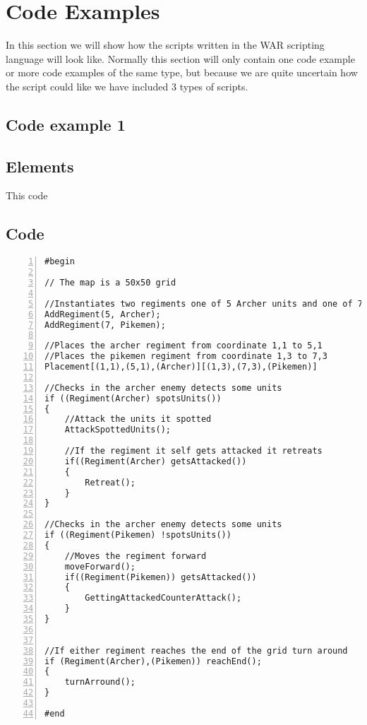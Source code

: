 \section{Code Examples}
	In this section we will show how the scripts written in the WAR scripting language will look like.
	Normally this section will only contain one code example or more code examples of the same type, 
	but because we are quite uncertain how the script could like we have included 3 types of scripts.
	\subsection{Code example 1}
		\subsection{Elements}
			This code 
		\subsection{Code}
			\begin{lstlisting}[basicstyle=\small\sffamily,
				keywords={break,case,const,continue,default,else,enum,
				for,if,return,switch,while,do,long,void,int,float,double,
				char,struct,typedef,include,size\_t},
				keywordstyle={\color{blue}},
				comment={[l]{//}}, morecomment={[s]{/*}{*/}}, commentstyle=\itshape,
				columns={[l]flexible}, numbers=left, numberstyle=\tiny,
				frameround=fftt, frame=shadowbox, captionpos=b,
				caption={Code example 1},
				label=LST:code1]
#begin

// The map is a 50x50 grid

//Instantiates two regiments one of 5 Archer units and one of 7 Pikemen units:
AddRegiment(5, Archer);
AddRegiment(7, Pikemen);

//Places the archer regiment from coordinate 1,1 to 5,1
//Places the pikemen regiment from coordinate 1,3 to 7,3
Placement[(1,1),(5,1),(Archer)][(1,3),(7,3),(Pikemen)]

//Checks in the archer enemy detects some units
if ((Regiment(Archer) spotsUnits())
{
	//Attack the units it spotted
	AttackSpottedUnits();

	//If the regiment it self gets attacked it retreats
	if((Regiment(Archer) getsAttacked())
	{
		Retreat();
	}
}

//Checks in the archer enemy detects some units
if ((Regiment(Pikemen) !spotsUnits())
{
	//Moves the regiment forward	
	moveForward();
	if((Regiment(Pikemen)) getsAttacked())
	{
		GettingAttackedCounterAttack();
	}
}


//If either regiment reaches the end of the grid turn around
if (Regiment(Archer),(Pikemen)) reachEnd();
{
	turnArround();
}

#end

		 	\end{lstlisting}

